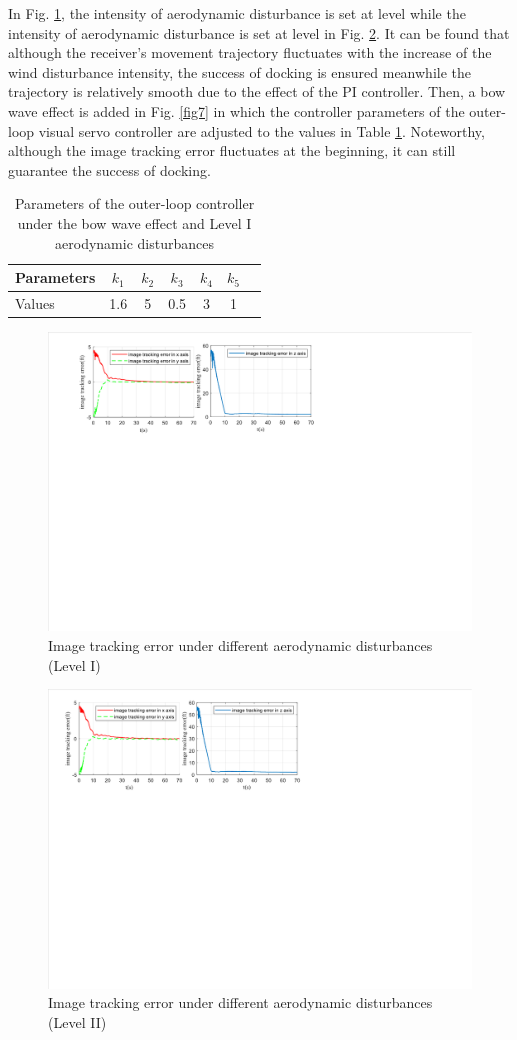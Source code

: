 In Fig. \ref{fig5}, the intensity of aerodynamic disturbance is set at level \uppercase\expandafter{} while the intensity of aerodynamic disturbance is set at level \uppercase\expandafter{} in Fig. \ref{fig6}. It can be found that although the receiver's movement trajectory fluctuates with the increase of the wind disturbance intensity, the success of docking is ensured meanwhile the trajectory is relatively smooth due to the effect of the PI controller. Then, a bow wave effect is added in Fig. \ref{fig7} in which the controller parameters of the outer-loop visual servo controller are adjusted to the values in Table \ref{tab2}. Noteworthy, although the image tracking error fluctuates at the beginning, it can still guarantee the success of docking.	
\begin{table}[h]
	\caption{Parameters of the outer-loop controller under the bow wave effect and Level I aerodynamic disturbances}
	\label{tab:Parameters of the outer loop under the bow wave effect}
	\centering
	\begin{tabular}{|l|c|c|c|c|c|c|}\hline
		Parameters&$ k_{1} $&$ k_{2} $&$ k_{3} $&$ k_{4} $&$ k_{5} $\\\hline
		Values&1.6&5&0.5&3&1\\\hline
	\end{tabular}\label{tab2}
\end{table}

\begin{figure}[htbp]
	\centerline{\includegraphics[width=.5\textwidth]{Figures/Figs_Ch11/fig5.pdf}}
	\caption{Image tracking error under different aerodynamic disturbances (Level I)}\label{fig5}
\end{figure}
\begin{figure}[htbp]
	\centerline{\includegraphics[width=.5\textwidth]{Figures/Figs_Ch11/fig6.pdf}}
	\caption{Image tracking error under different aerodynamic disturbances (Level II)}\label{fig6}
\end{figure}

